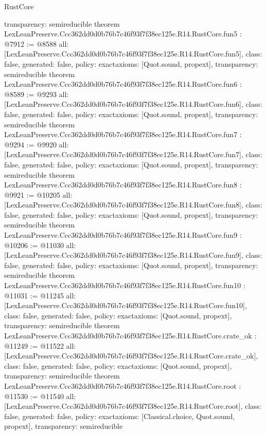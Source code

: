 \begin{lexlean}{RustCore}
\begin{coremodule}
{  transparency: semireducible
}
theorem LexLeanPreserve.Ccc362dd0d0b76b7c46f93f7f38ec125e.R14.RustCore.fun5 : @7912 := @8588 {
  all: [LexLeanPreserve.Ccc362dd0d0b76b7c46f93f7f38ec125e.R14.RustCore.fun5],
  class: false,
  generated: false,
  policy: exact{axioms: [Quot.sound, propext]},
  transparency: semireducible
}
theorem LexLeanPreserve.Ccc362dd0d0b76b7c46f93f7f38ec125e.R14.RustCore.fun6 : @8589 := @9293 {
  all: [LexLeanPreserve.Ccc362dd0d0b76b7c46f93f7f38ec125e.R14.RustCore.fun6],
  class: false,
  generated: false,
  policy: exact{axioms: [Quot.sound, propext]},
  transparency: semireducible
}
theorem LexLeanPreserve.Ccc362dd0d0b76b7c46f93f7f38ec125e.R14.RustCore.fun7 : @9294 := @9920 {
  all: [LexLeanPreserve.Ccc362dd0d0b76b7c46f93f7f38ec125e.R14.RustCore.fun7],
  class: false,
  generated: false,
  policy: exact{axioms: [Quot.sound, propext]},
  transparency: semireducible
}
theorem LexLeanPreserve.Ccc362dd0d0b76b7c46f93f7f38ec125e.R14.RustCore.fun8 : @9921 := @10205 {
  all: [LexLeanPreserve.Ccc362dd0d0b76b7c46f93f7f38ec125e.R14.RustCore.fun8],
  class: false,
  generated: false,
  policy: exact{axioms: [Quot.sound, propext]},
  transparency: semireducible
}
theorem LexLeanPreserve.Ccc362dd0d0b76b7c46f93f7f38ec125e.R14.RustCore.fun9 : @10206 := @11030 {
  all: [LexLeanPreserve.Ccc362dd0d0b76b7c46f93f7f38ec125e.R14.RustCore.fun9],
  class: false,
  generated: false,
  policy: exact{axioms: [Quot.sound, propext]},
  transparency: semireducible
}
theorem LexLeanPreserve.Ccc362dd0d0b76b7c46f93f7f38ec125e.R14.RustCore.fun10 : @11031 := @11245 {
  all: [LexLeanPreserve.Ccc362dd0d0b76b7c46f93f7f38ec125e.R14.RustCore.fun10],
  class: false,
  generated: false,
  policy: exact{axioms: [Quot.sound, propext]},
  transparency: semireducible
}
theorem LexLeanPreserve.Ccc362dd0d0b76b7c46f93f7f38ec125e.R14.RustCore.crate_ok : @11249 := @11522 {
  all: [LexLeanPreserve.Ccc362dd0d0b76b7c46f93f7f38ec125e.R14.RustCore.crate_ok],
  class: false,
  generated: false,
  policy: exact{axioms: [Quot.sound, propext]},
  transparency: semireducible
}
theorem LexLeanPreserve.Ccc362dd0d0b76b7c46f93f7f38ec125e.R14.RustCore.root : @11530 := @11540 {
  all: [LexLeanPreserve.Ccc362dd0d0b76b7c46f93f7f38ec125e.R14.RustCore.root],
  class: false,
  generated: false,
  policy: exact{axioms: [Classical.choice, Quot.sound, propext]},
  transparency: semireducible
}


\end{coremodule}
\end{lexlean}
